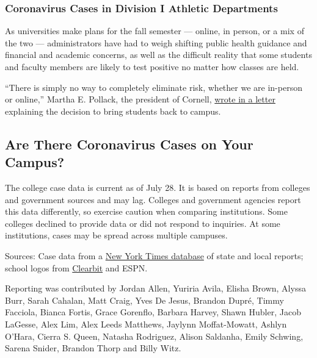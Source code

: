 \hypertarget{coronavirus-cases-in-division-i-athletic-departments}{%
\subsubsection{Coronavirus Cases in Division I Athletic
Departments}\label{coronavirus-cases-in-division-i-athletic-departments}}

As universities make plans for the fall semester --- online, in person,
or a mix of the two --- administrators have had to weigh shifting public
health guidance and financial and academic concerns, as well as the
difficult reality that some students and faculty members are likely to
test positive no matter how classes are held.

``There is simply no way to completely eliminate risk, whether we are
in-person or online,'' Martha E. Pollack, the president of Cornell,
\href{https://covid.cornell.edu/updates/20200630-reactivate-campus.cfm}{wrote
in a letter} explaining the decision to bring students back to campus.

\hypertarget{are-there-coronavirus-cases-on-your-campus}{%
\subsection{Are There Coronavirus Cases on Your
Campus?}\label{are-there-coronavirus-cases-on-your-campus}}

The college case data is current as of July 28. It is based on reports
from colleges and government sources and may lag. Colleges and
government agencies report this data differently, so exercise caution
when comparing institutions. Some colleges declined to provide data or
did not respond to inquiries. At some institutions, cases may be spread
across multiple campuses.

Sources: Case data from a
\href{https://www.nytimes3xbfgragh.onion/interactive/2020/us/coronavirus-us-cases.html}{New
York Times database} of state and local reports; school logos from
\href{https://clearbit.com}{Clearbit} and ESPN.

Reporting was contributed by Jordan Allen, Yuriria Avila, Elisha Brown,
Alyssa Burr, Sarah Cahalan, Matt Craig, Yves De Jesus, Brandon Dupré,
Timmy Facciola, Bianca Fortis, Grace Gorenflo, Barbara Harvey, Shawn
Hubler, Jacob LaGesse, Alex Lim, Alex Leeds Matthews, Jaylynn
Moffat-Mowatt, Ashlyn O'Hara, Cierra S. Queen, Natasha Rodriguez, Alison
Saldanha, Emily Schwing, Sarena Snider, Brandon Thorp and Billy Witz.

